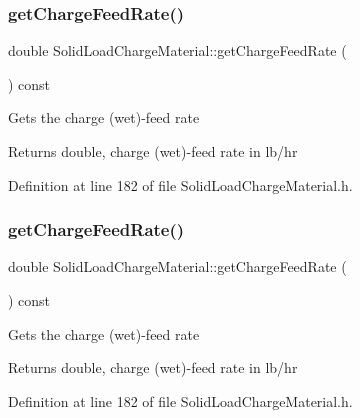 \subsubsection{\texorpdfstring{get\+Charge\+Feed\+Rate()}{getChargeFeedRate()}\hspace{0.1cm}{\footnotesize\ttfamily [1/3]}}
{\footnotesize\ttfamily double Solid\+Load\+Charge\+Material\+::get\+Charge\+Feed\+Rate (\begin{DoxyParamCaption}{ }\end{DoxyParamCaption}) const\hspace{0.3cm}{\ttfamily [inline]}}

Gets the charge (wet)-\/feed rate \begin{DoxyReturn}{Returns}
double, charge (wet)-\/feed rate in lb/hr 
\end{DoxyReturn}


Definition at line 182 of file Solid\+Load\+Charge\+Material.\+h.

\mbox{\label{class_solid_load_charge_material_af6f018c5d67e94d86f2f57fecaa32b5c}} 
\subsubsection{\texorpdfstring{get\+Charge\+Feed\+Rate()}{getChargeFeedRate()}\hspace{0.1cm}{\footnotesize\ttfamily [2/3]}}
{\footnotesize\ttfamily double Solid\+Load\+Charge\+Material\+::get\+Charge\+Feed\+Rate (\begin{DoxyParamCaption}{ }\end{DoxyParamCaption}) const\hspace{0.3cm}{\ttfamily [inline]}}

Gets the charge (wet)-\/feed rate \begin{DoxyReturn}{Returns}
double, charge (wet)-\/feed rate in lb/hr 
\end{DoxyReturn}


Definition at line 182 of file Solid\+Load\+Charge\+Material.\+h.

\mbox{\label{class_solid_load_charge_material_af6f018c5d67e94d86f2f57fecaa32b5c}} 
